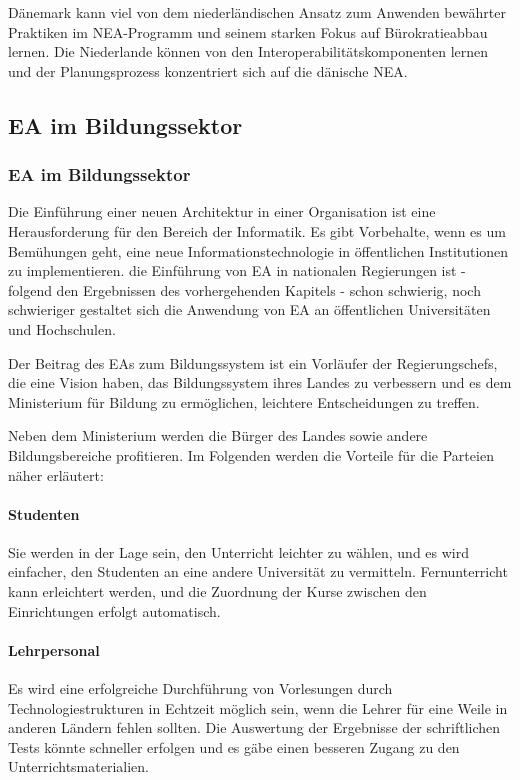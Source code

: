 \documentclass[
	doc,
	a4paper,
	helv
	]{apa6}
\begin{document}
Dänemark kann viel von dem niederländischen Ansatz zum Anwenden bewährter Praktiken im NEA-Programm und seinem starken Fokus auf Bürokratieabbau lernen. Die Niederlande können von den Interoperabilitätskomponenten lernen und der Planungsprozess konzentriert sich auf die dänische NEA.
	
\subsection{EA im Bildungssektor}
\subsubsection{EA im Bildungssektor}
Die Einführung einer neuen Architektur in einer Organisation ist eine Herausforderung für den Bereich der Informatik. Es gibt Vorbehalte, wenn es um Bemühungen geht, eine neue Informationstechnologie in öffentlichen Institutionen zu implementieren.  die Einführung  von EA in nationalen Regierungen ist -  folgend den Ergebnissen des vorhergehenden Kapitels - schon schwierig, noch schwieriger gestaltet sich die Anwendung von EA an öffentlichen Universitäten und Hochschulen.	

Der Beitrag des EAs zum Bildungssystem ist ein Vorläufer der Regierungschefs, die eine Vision haben, das Bildungssystem ihres Landes zu verbessern und es dem Ministerium für Bildung zu ermöglichen, leichtere Entscheidungen zu treffen.

Neben dem Ministerium werden die Bürger des Landes sowie andere Bildungsbereiche profitieren.
Im Folgenden werden die Vorteile für die Parteien näher erläutert:
\paragraph{Studenten}
Sie werden in der Lage sein, den Unterricht leichter zu wählen, und es wird einfacher, den Studenten an eine andere Universität zu vermitteln. Fernunterricht kann erleichtert werden, und die Zuordnung der Kurse zwischen den Einrichtungen erfolgt automatisch.
\paragraph{Lehrpersonal}
Es wird eine erfolgreiche Durchführung von Vorlesungen durch Technologiestrukturen in Echtzeit möglich sein, wenn die Lehrer für eine Weile in anderen Ländern fehlen sollten. Die Auswertung der Ergebnisse der schriftlichen Tests könnte schneller erfolgen und es gäbe einen besseren Zugang zu den Unterrichtsmaterialien.
\end{document}
